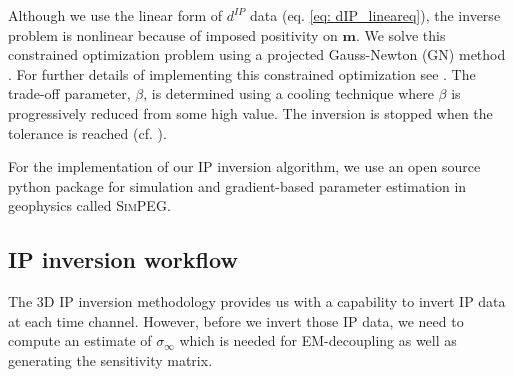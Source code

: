 \documentclass[extra,mreferee]{gji}
\newcommand{\SimPEG}{\textsc{SimPEG}\xspace}
\newcommand{\siginf}{\sigma_\infty}
\newcommand{\dip}{d^{IP}}
\begin{document}
Although we use the linear form of $\dip$ data (eq. \ref{eq: dIP_lineareq}), the inverse problem is nonlinear because of imposed positivity on $\mathbf{m}$.  
We solve this constrained optimization problem using a projected Gauss-Newton (GN) method \cite[]{Kelley}. For further details of implementing this constrained optimization see \cite{Marchant2012b}.
The trade-off parameter, $\beta$, is determined using a cooling technique where $\beta$ is progressively reduced from some high value. The inversion is stopped when the tolerance is reached (cf. \cite{Nocedal1999,DougTutorial,Kang2015a}). 

For the implementation of our IP inversion algorithm, we use an open source python package for simulation and gradient-based parameter estimation in geophysics called \SimPEG \cite[]{Cockett2015}. 


\subsection{IP inversion workflow}
The 3D IP inversion methodology provides us with a capability to invert IP data at each time channel. However, before we invert those IP data, we need to compute an estimate of $\siginf$ which is needed for EM-decoupling as well as generating the sensitivity matrix. 


\end{document}

